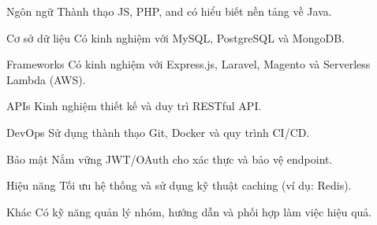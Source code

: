 

\begin{cvskills}

  \cvskill
    {Ngôn ngữ} %
    {Thành thạo JS, PHP, and có hiểu biết nền tảng về Java.} %

  \cvskill
    {Cơ sở dữ liệu} %
    {Có kinh nghiệm với MySQL, PostgreSQL và MongoDB.} %

  \cvskill
    {Frameworks} %
    {Có kinh nghiệm với Express.js, Laravel, Magento và Serverless Lambda (AWS).} %

  \cvskill
    {APIs} %
    {Kinh nghiệm thiết kế và duy trì RESTful API.} %

  \cvskill
    {DevOps} %
    {Sử dụng thành thạo Git, Docker và quy trình CI/CD.} %

  \cvskill
    {Bảo mật} %
    {Nắm vững JWT/OAuth cho xác thực và bảo vệ endpoint.} %

  \cvskill
    {Hiệu năng} %
    {Tối ưu hệ thống và sử dụng kỹ thuật caching (ví dụ: Redis).} %

  \cvskill
    {Khác} %
    {Có kỹ năng quản lý nhóm, hướng dẫn và phối hợp làm việc hiệu quả.} %

\end{cvskills}
